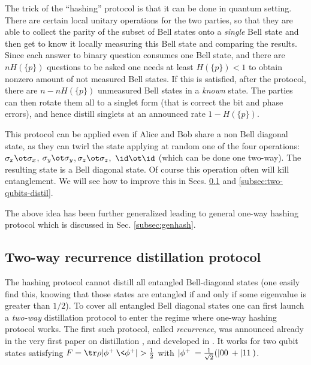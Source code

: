\documentclass[rmp,12pt,preprint]{revtex4-2}
\begin{document}
The trick of the ``hashing'' protocol is that it can be done in
quantum setting. There are certain local unitary operations for the
two parties, so that they are able to collect the parity of the subset
of Bell states onto a {\it single} Bell state and then get to know it
locally measuring this Bell state and comparing the results. Since
each answer to binary question consumes one Bell state, and there are
$nH(\{p\})$ questions to be asked one needs at least $H(\{p\})<1$ to
obtain nonzero amount of not measured Bell states. If this is
satisfied, after the protocol, there are $n- nH(\{p\})$ unmeasured Bell
states in a {\it known} state. The parties can then rotate them all to
a singlet form (that is correct the bit and phase errors), and hence
distill singlets at an announced rate $1-H(\{p\})$.

This protocol can be applied even if Alice and Bob share a non Bell
diagonal state, as they can twirl the state applying at random one of
the four operations: $\sigma_x\ot \sigma_x$, $\sigma_y\ot
\sigma_y$,\,$\sigma_z\ot \sigma_z$,\, $\id\ot \id$ (which can be done
one two-way).  The resulting state is a Bell diagonal state. Of course
this operation often will kill entanglement. We will see how to
improve this in Secs. \ref{subsec:recur} and
\ref{subsec:two-qubits-distil}.

The above idea has been further generalized leading to general one-way
hashing protocol which is discussed in Sec. \ref{subsec:genhash}.


\subsection{Two-way recurrence distillation protocol}
\label{subsec:recur}

The hashing protocol cannot distill all entangled Bell-diagonal
states (one easily find this, knowing that those states are
entangled if and only if some eigenvalue is greater than $1/2$). To
cover all entangled Bell diagonal states one can first launch a {\it
two-way} distillation protocol to enter the regime where one-way
hashing protocol works. The first such protocol, called {\it
recurrence}, was announced already in the very first paper on
distillation \cite{BBPSSW1996}, and developed in \cite{BDSW1996}.
It works for two qubit states satisfying
$F=\tr\rho|\phi^+\>\<\phi^+|>{1\over 2}$ with $|\phi^+\>= {1\over
\sqrt 2}(|00\>+|11\>)$.
\end{document}
